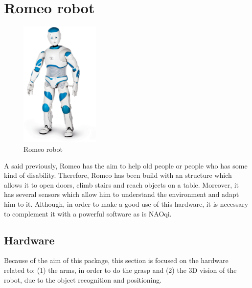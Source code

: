 \documentclass[12pt,a4paper,final,twoside,openright]{report}
\begin{document}
\section{Romeo robot}
\begin{figure}
\vspace{-40pt}
	    \centering
		\includegraphics[width=0.35\textwidth]{images/Romeo.eps}
         \caption{Romeo robot \cite{Penton}}
\vspace{-40pt}
\end{figure}

A said previously, Romeo has the aim to help old people or people who has some kind of disability. Therefore, Romeo has been build with an structure which allows it to open doors, climb stairs and reach objects on a table. Moreover, it has several sensors which allow him to understand the environment and adapt him to it. Although, in order to make a good use of this hardware, it is necessary to complement it with a powerful software as is NAOqi.


\subsection{Hardware}
\label{sec:romeo_hardware}

Because of the aim of this package, this section is focused on the hardware related to: (1) the arms, in order to do the grasp and (2) the 3D vision of the robot, due to the object recognition and positioning.

%
\end{document}
